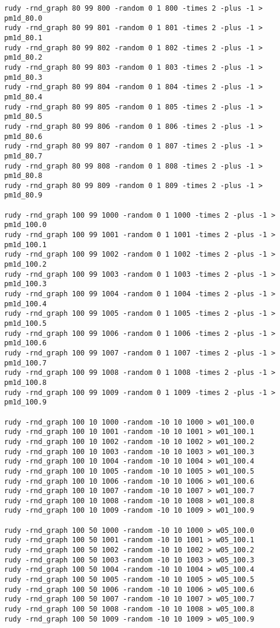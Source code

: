 \documentclass[a4paper, 12pt]{article}
\begin{document}
\begin{tiny}
\begin{verbatim}
rudy -rnd_graph 80 99 800 -random 0 1 800 -times 2 -plus -1 > pm1d_80.0
rudy -rnd_graph 80 99 801 -random 0 1 801 -times 2 -plus -1 > pm1d_80.1
rudy -rnd_graph 80 99 802 -random 0 1 802 -times 2 -plus -1 > pm1d_80.2
rudy -rnd_graph 80 99 803 -random 0 1 803 -times 2 -plus -1 > pm1d_80.3
rudy -rnd_graph 80 99 804 -random 0 1 804 -times 2 -plus -1 > pm1d_80.4
rudy -rnd_graph 80 99 805 -random 0 1 805 -times 2 -plus -1 > pm1d_80.5
rudy -rnd_graph 80 99 806 -random 0 1 806 -times 2 -plus -1 > pm1d_80.6
rudy -rnd_graph 80 99 807 -random 0 1 807 -times 2 -plus -1 > pm1d_80.7
rudy -rnd_graph 80 99 808 -random 0 1 808 -times 2 -plus -1 > pm1d_80.8
rudy -rnd_graph 80 99 809 -random 0 1 809 -times 2 -plus -1 > pm1d_80.9

rudy -rnd_graph 100 99 1000 -random 0 1 1000 -times 2 -plus -1 > pm1d_100.0
rudy -rnd_graph 100 99 1001 -random 0 1 1001 -times 2 -plus -1 > pm1d_100.1
rudy -rnd_graph 100 99 1002 -random 0 1 1002 -times 2 -plus -1 > pm1d_100.2
rudy -rnd_graph 100 99 1003 -random 0 1 1003 -times 2 -plus -1 > pm1d_100.3
rudy -rnd_graph 100 99 1004 -random 0 1 1004 -times 2 -plus -1 > pm1d_100.4
rudy -rnd_graph 100 99 1005 -random 0 1 1005 -times 2 -plus -1 > pm1d_100.5
rudy -rnd_graph 100 99 1006 -random 0 1 1006 -times 2 -plus -1 > pm1d_100.6
rudy -rnd_graph 100 99 1007 -random 0 1 1007 -times 2 -plus -1 > pm1d_100.7
rudy -rnd_graph 100 99 1008 -random 0 1 1008 -times 2 -plus -1 > pm1d_100.8
rudy -rnd_graph 100 99 1009 -random 0 1 1009 -times 2 -plus -1 > pm1d_100.9

rudy -rnd_graph 100 10 1000 -random -10 10 1000 > w01_100.0
rudy -rnd_graph 100 10 1001 -random -10 10 1001 > w01_100.1
rudy -rnd_graph 100 10 1002 -random -10 10 1002 > w01_100.2
rudy -rnd_graph 100 10 1003 -random -10 10 1003 > w01_100.3
rudy -rnd_graph 100 10 1004 -random -10 10 1004 > w01_100.4
rudy -rnd_graph 100 10 1005 -random -10 10 1005 > w01_100.5
rudy -rnd_graph 100 10 1006 -random -10 10 1006 > w01_100.6
rudy -rnd_graph 100 10 1007 -random -10 10 1007 > w01_100.7
rudy -rnd_graph 100 10 1008 -random -10 10 1008 > w01_100.8
rudy -rnd_graph 100 10 1009 -random -10 10 1009 > w01_100.9

rudy -rnd_graph 100 50 1000 -random -10 10 1000 > w05_100.0
rudy -rnd_graph 100 50 1001 -random -10 10 1001 > w05_100.1
rudy -rnd_graph 100 50 1002 -random -10 10 1002 > w05_100.2
rudy -rnd_graph 100 50 1003 -random -10 10 1003 > w05_100.3
rudy -rnd_graph 100 50 1004 -random -10 10 1004 > w05_100.4
rudy -rnd_graph 100 50 1005 -random -10 10 1005 > w05_100.5
rudy -rnd_graph 100 50 1006 -random -10 10 1006 > w05_100.6
rudy -rnd_graph 100 50 1007 -random -10 10 1007 > w05_100.7
rudy -rnd_graph 100 50 1008 -random -10 10 1008 > w05_100.8
rudy -rnd_graph 100 50 1009 -random -10 10 1009 > w05_100.9


\end{verbatim}
\end{tiny}
\end{document}
